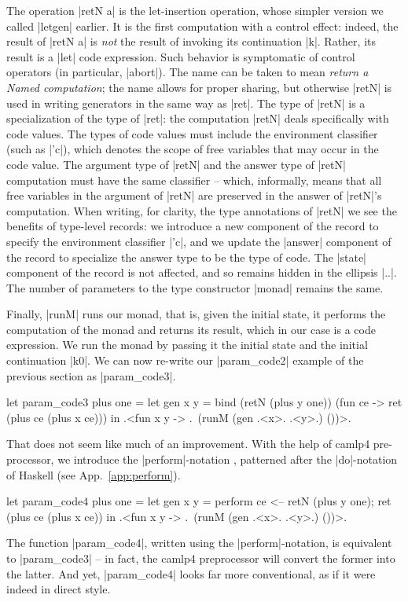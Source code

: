 \documentclass{elsart}
\begin{document}
The operation |retN a| is the let-insertion operation, whose simpler
version we called |letgen| earlier. It is the first computation with a
control effect: indeed, the result of |retN a| is \emph{not} the
result of invoking its continuation |k|. Rather, its result is a |let|
code expression. Such behavior is symptomatic of control operators (in
particular, |abort|).  The name can be taken to mean \emph{return a
  Named computation}; the name allows for proper sharing, but
otherwise |retN| is used in writing generators in the same way as
|ret|. The type of |retN| is a specialization of the type of |ret|:
the computation |retN| deals specifically with code values. The types
of code values must include the environment classifier 
(such as |'c|), which denotes
the scope of free variables that may occur in the code value. The
argument type of |retN| and the answer type of |retN| computation must
have the same classifier -- which, informally, means that all free
variables in the argument of |retN| are preserved in the answer of
|retN|'s computation. When writing, for clarity, the type annotations
of |retN| we see the benefits of type-level records: we introduce a
new component of the record to specify the environment classifier
|'c|, and we update the |answer| component of the record to specialize
the answer type to be the type of code. The |state| component of the
record is not affected, and so remains hidden in the ellipsis |..|. The
number of parameters to the type constructor |monad| remains the same.

Finally, |runM| runs our monad, that is, given the initial state,
it performs the computation of
the monad and returns its result, which in our case is a code
expression. We run the monad by passing it the initial state and the
initial continuation |k0|. We can now re-write our |param_code2|
example of the previous section as |param_code3|.
\begin{code}
let param_code3 plus one =
  let gen x y = bind (retN (plus y one)) (fun ce -> 
                ret (plus ce (plus x ce)))
  in .<fun x y -> .~(runM (gen .<x>. .<y>.) ())>.
\end{code}
%
That does not seem like much of an improvement. With the help of
camlp4 pre-processor, we introduce the |perform|-notation \cite{metamonadsURL},
patterned after the |do|-notation of Haskell (see App.~\ref{app:perform}).
\begin{code}
let param_code4 plus one =
  let gen x y = perform ce <-- retN (plus y one);
                        ret (plus ce (plus x ce))
  in .<fun x y -> .~(runM (gen .<x>. .<y>.) ())>.
\end{code}
The function
|param_code4|, written using the |perform|-notation, is equivalent to
|param_code3| -- in fact, the camlp4 preprocessor will convert the
former into the latter. And yet, |param_code4| looks far more
conventional, as if it were indeed in direct style.
\end{document}
